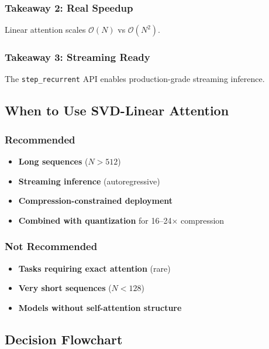 \subsubsection{Takeaway 2: Real Speedup}

Linear attention scales $\mathcal{O}(N)$ vs $\mathcal{O}(N^2)$.

\subsubsection{Takeaway 3: Streaming Ready}

The \texttt{step\_recurrent} API enables production-grade streaming inference.

\subsection{When to Use SVD-Linear Attention}

\subsubsection{Recommended}

\begin{itemize}
\item \textbf{Long sequences} ($N > 512$)
\item \textbf{Streaming inference} (autoregressive)
\item \textbf{Compression-constrained deployment}
\item \textbf{Combined with quantization} for 16--24$\times$ compression

\end{itemize}
\subsubsection{Not Recommended}

\begin{itemize}
\item \textbf{Tasks requiring exact attention} (rare)
\item \textbf{Very short sequences} ($N < 128$)
\item \textbf{Models without self-attention structure}

\end{itemize}
\subsection{Decision Flowchart}

